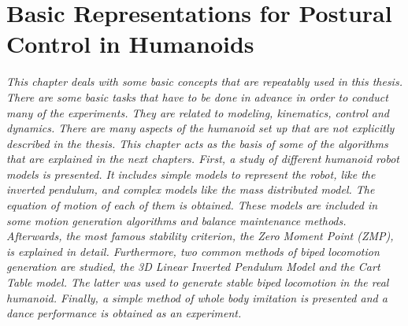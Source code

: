 \chapter{Basic Representations for Postural Control in Humanoids}\label{ch_basics}
\textit{This chapter deals with some basic concepts that are repeatably used in this thesis. There are some basic tasks that have to be done in advance in order to conduct many of the experiments. They are related to modeling, kinematics, control and dynamics. There are many aspects of the humanoid set up that are not explicitly described in the thesis. This chapter acts as the basis of some of the algorithms that are explained in the next chapters. First, a study of different humanoid robot models is presented. It includes simple models to represent the robot, like the inverted pendulum, and complex models like the mass distributed model. The equation of motion of each of them is obtained. These models are included in some  motion generation algorithms and balance maintenance methods. Afterwards, the most famous stability criterion, the Zero Moment Point (ZMP),  is explained in detail. Furthermore, two common methods of biped locomotion generation are studied, the 3D Linear Inverted Pendulum Model and the Cart Table model. The latter was used to generate stable biped locomotion in the real humanoid. Finally, a simple method of whole body imitation is presented and a dance performance is obtained as an experiment. }
\newpage





